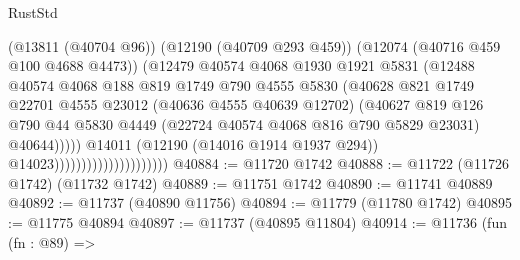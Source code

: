\begin{lexlean}{RustStd}
\begin{coremodule}
                                                (@13811 (@40704 @96))
                                                (@12190 (@40709 @293 @459))
                                                (@12074 (@40716 @459 @100 @4688 @4473))
                                                (@12479
                                                  @40574
                                                  @4068
                                                  @1930
                                                  @1921
                                                  @5831
                                                  (@12488
                                                    @40574
                                                    @4068
                                                    @188
                                                    @819
                                                    @1749
                                                    @790
                                                    @4555
                                                    @5830
                                                    (@40628
                                                      @821
                                                      @1749
                                                      @22701
                                                      @4555
                                                      @23012
                                                      (@40636 @4555 @40639 @12702)
                                                      (@40627
                                                        @819
                                                        @126
                                                        @790
                                                        @44
                                                        @5830
                                                        @4449
                                                        (@22724 @40574 @4068 @816 @790 @5829 @23031)
                                                        @40644)))))
                                              @14011
                                              (@12190 (@14016 @1914 @1937 @294))
                                              @14023)))))))))))))))))))))
@40884 := @11720 @1742
@40888 := @11722 (@11726 @1742) (@11732 @1742)
@40889 := @11751 @1742
@40890 := @11741 @40889
@40892 := @11737 (@40890 @11756)
@40894 := @11779 (@11780 @1742)
@40895 := @11775 @40894
@40897 := @11737 (@40895 @11804)
@40914 := @11736
    (fun (fn : @89) =>

\end{coremodule}
\end{lexlean}
